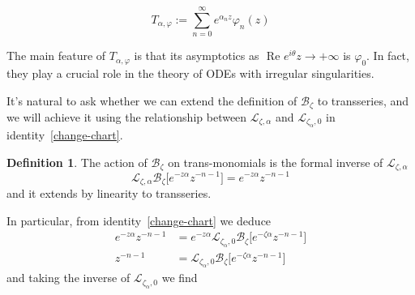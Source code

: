\documentclass{article}
\newcommand{\laplace}{\mathcal{L}}
\newcommand{\borel}{\mathcal{B}}
\theoremstyle{definition}
\newtheorem{definition}{Definition}[section]
\theoremstyle{plain}
\begin{document}
\[T_{\alpha,\varphi}:=\sum_{n=0}^{\infty} e^{\alpha_n z} \varphi_n(z) \]

The main feature of $T_{\alpha,\varphi}$ is that its asymptotics as $\text{ Re } e^{i\theta}z \to +\infty$ is $\varphi_0$. In fact, they play a crucial role in the theory of ODEs with irregular singularities. 

It's natural to ask whether we can extend the definition of $\borel_\zeta$ to transseries, and we will achieve it using the relationship between $\laplace_{\zeta, \alpha}$ and $\laplace_{\zeta_\alpha, 0}$ in identity~\eqref{change-chart}.
\color{black}
\begin{definition}
    The action of $\borel_\zeta$ on trans-monomials is the formal inverse of $\laplace_{\zeta,\alpha}$
    \[\laplace_{\zeta,\alpha}\borel_\zeta\big[e^{-z\alpha}z^{-n-1}\big]=e^{-z\alpha}z^{-n-1}\]
    and it extends by linearity to transseries. 
\end{definition}
In particular, from identity~\eqref{change-chart} we deduce 
\begin{align*}
    e^{-z\alpha}z^{-n-1}&=e^{-z\alpha}\laplace_{\zeta_\alpha,0}\borel_\zeta\big[e^{-\zeta\alpha}z^{-n-1}\big]\\
     z^{-n-1}&=\laplace_{\zeta_\alpha,0}\borel_\zeta\big[e^{-\zeta\alpha}z^{-n-1}\big]
\end{align*}
and taking the inverse of $\laplace_{\zeta_\alpha,0}$ we find
\end{document}
